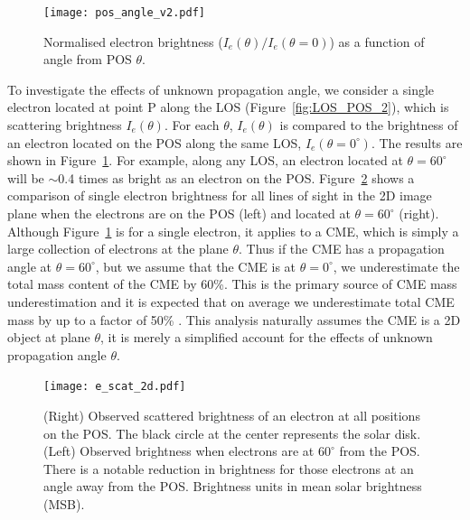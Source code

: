 \begin{figure}[!t]
\begin{center}
\texttt{[image: pos\_angle\_v2.pdf]}
\caption[Electron brightness as function of angle]{{\color{black}Normalised electron brightness ($I_e(\theta)/I_e(\theta=0)$) as a function of angle from POS $\theta$.}}
\label{fig:pos_angle}
\end{center}
\end{figure}
To investigate the effects of unknown propagation angle, we consider a single electron located at point P along the LOS (Figure~\ref{fig:LOS_POS_2}), which is scattering brightness $I_e(\theta)$. For each $\theta$, $I_e(\theta)$ is compared to the brightness of an electron located on the POS along the same LOS, $I_e(\theta=0^{\circ})$. The results are shown in Figure~\ref{fig:pos_angle}. For example, along any LOS, an electron located at $\theta=60^{\circ}$ will be $\sim$0.4 times as bright as an electron on the POS. 
%
%
Figure~\ref{fig:scattering2d} shows a comparison of single electron brightness for all lines of sight in the 2D image plane when the electrons are on the POS (left) and located at $\theta=60^{\circ}$ (right). 
%
%
Although Figure~\ref{fig:pos_angle} is for a single electron, it applies to a CME, which is simply a large collection of electrons at the plane $\theta$. Thus if the CME has a propagation angle at $\theta=60^{\circ}$, but we assume that the CME is at $\theta=0^{\circ}$, we underestimate the total mass content of the CME by 60\%. This is the primary source of CME mass underestimation and it is expected that on average we underestimate total CME mass by up to a factor of 50\% \citep{vou00}. This analysis naturally assumes the CME is a 2D object at plane $\theta$, it is merely a simplified account for the effects of unknown propagation angle $\theta$.

\begin{figure}[!t]
\begin{center}
\texttt{[image: e\_scat\_2d.pdf]}
\caption[Electron brightness on and away the POS]{(Right) Observed scattered brightness of an electron at all positions on the POS. The black circle at the center represents the solar disk. (Left) Observed brightness when electrons are at $60^{\circ}$ from the POS. There is a notable reduction in brightness for those electrons at an angle away from the POS. Brightness units in mean solar brightness (MSB).}
\label{fig:scattering2d}
\end{center}
\end{figure}

